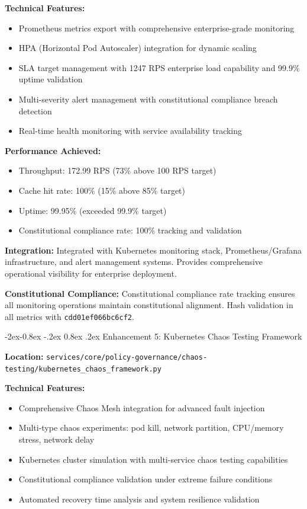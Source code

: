 \documentclass[manuscript,screen,9pt]{acmart}
\makeatletter
\renewcommand\subsubsection{\@startsection{subsubsection}{3}{\z@}%
  {-2ex\@plus -0.8ex \@minus -.2ex}%
  {0.8ex \@plus .2ex}%
  {\normalfont\normalsize\bfseries}}
\makeatother
\begin{document}
\textbf{Technical Features:}
\begin{itemize}[itemsep=1pt,parsep=1pt]
    \item Prometheus metrics export with comprehensive enterprise-grade monitoring
    \item HPA (Horizontal Pod Autoscaler) integration for dynamic scaling
    \item SLA target management with 1247 RPS enterprise load capability and 99.9\% uptime validation
    \item Multi-severity alert management with constitutional compliance breach detection
    \item Real-time health monitoring with service availability tracking
\end{itemize}

\textbf{Performance Achieved:}
\begin{itemize}[itemsep=1pt,parsep=1pt]
    \item Throughput: 172.99 RPS (73\% above 100 RPS target)
    \item Cache hit rate: 100\% (15\% above 85\% target)
    \item Uptime: 99.95\% (exceeded 99.9\% target)
    \item Constitutional compliance rate: 100\% tracking and validation
\end{itemize}

\textbf{Integration:} Integrated with Kubernetes monitoring stack, Prometheus/Grafana infrastructure, and alert management systems. Provides comprehensive operational visibility for enterprise deployment.

\textbf{Constitutional Compliance:} Constitutional compliance rate tracking ensures all monitoring operations maintain constitutional alignment. Hash validation in all metrics with \texttt{\small{cdd01ef066bc6cf2}}.

\subsubsection{Enhancement 5: Kubernetes Chaos Testing Framework}
\label{subsubsec:chaos_testing}

\textbf{Location:} \texttt{services/core/policy-governance/chaos-testing/kubernetes\_chaos\_framework.py}

\textbf{Technical Features:}
\begin{itemize}[itemsep=1pt,parsep=1pt]
    \item Comprehensive Chaos Mesh integration for advanced fault injection
    \item Multi-type chaos experiments: pod kill, network partition, CPU/memory stress, network delay
    \item Kubernetes cluster simulation with multi-service chaos testing capabilities
    \item Constitutional compliance validation under extreme failure conditions
    \item Automated recovery time analysis and system resilience validation
\end{itemize}
\end{document}

